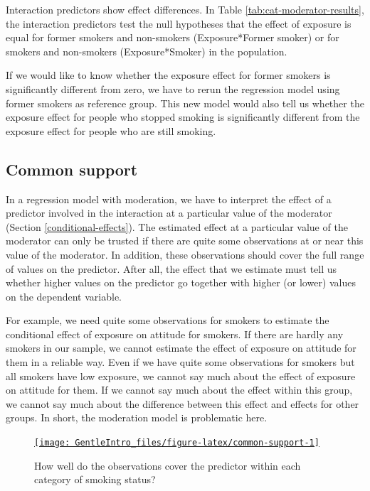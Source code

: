\documentclass[a4paper]{book}
\theoremstyle{definition}
\theoremstyle{definition}
\theoremstyle{definition}
\theoremstyle{remark}
\begin{document}
Interaction predictors show effect differences. In Table
\ref{tab:cat-moderator-results}, the interaction predictors test the
null hypotheses that the effect of exposure is equal for former smokers
and non-smokers (Exposure*Former smoker) or for smokers and non-smokers
(Exposure*Smoker) in the population.

If we would like to know whether the exposure effect for former smokers
is significantly different from zero, we have to rerun the regression
model using former smokers as reference group. This new model would also
tell us whether the exposure effect for people who stopped smoking is
significantly different from the exposure effect for people who are
still smoking.

\subsection{Common support}\label{commonsupportdichotomous}

In a regression model with moderation, we have to interpret the effect
of a predictor involved in the interaction at a particular value of the
moderator (Section \ref{conditional-effects}). The estimated effect at a
particular value of the moderator can only be trusted if there are quite
some observations at or near this value of the moderator. In addition,
these observations should cover the full range of values on the
predictor. After all, the effect that we estimate must tell us whether
higher values on the predictor go together with higher (or lower) values
on the dependent variable.

For example, we need quite some observations for smokers to estimate the
conditional effect of exposure on attitude for smokers. If there are
hardly any smokers in our sample, we cannot estimate the effect of
exposure on attitude for them in a reliable way. Even if we have quite
some observations for smokers but all smokers have low exposure, we
cannot say much about the effect of exposure on attitude for them. If we
cannot say much about the effect within this group, we cannot say much
about the difference between this effect and effects for other groups.
In short, the moderation model is problematic here.

\begin{figure}[H]
\href{http://82.196.4.233:3838/apps/common-support/}{\texttt{[image: GentleIntro\_files/figure-latex/common-support-1]} }\caption{How well do the observations cover the predictor within each category of smoking status?}\label{fig:common-support}
\end{figure}
\end{document}
